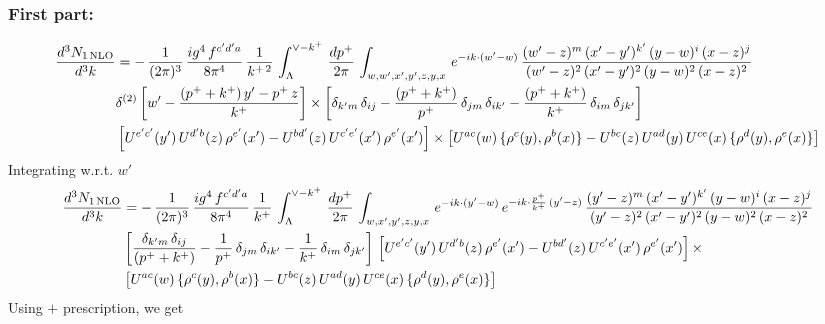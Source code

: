 \documentclass[9pt]{article}
\numberwithin{equation}{section}
\begin{document}
\subsubsection{First part:\,}
\begin{align}
     \frac{d^{3}N_{1\,\rm NLO}}{d^{3}k} & = -\, \frac{1}{(2\pi)^{3}}\,\frac{ig^{4}\,f^{c'd'a}}{8\pi^{4}}\, \frac{1}{k^{+\,2}}\,\int_{\Lambda}^{\vee-k^{+}}\, \frac{dp^{+}}{2\pi}\, \int_{w,w',x',y',z,y,x}\, e^{-ik\cdot (w'-w)}\, \frac{(w'-z)^{m}\,(x'-y')^{k'}\,(y-w)^{i}\,(x-z)^{j}}{(w'-z)^{2}\,(x'-y')^{2}\,(y-w)^{2}\,(x-z)^{2}}\notag \\ & \delta^{(2)}\left[w'-\frac{(p^{+}+k^{+})\,y'-p^{+}\,z}{k^{+}}\right]\times \left[\delta_{k'm}\,\delta_{ij}-\frac{(p^{+}+k^{+})}{p^{+}}\,\delta_{jm}\,\delta_{ik'}-\frac{(p^{+}+k^{+})}{k^{+}}\, \delta_{im}\, \delta_{jk'}\right]\notag \\ & \left[U^{e'c'}(y')\,U^{d'b}(z)\,\rho^{e'}(x')-U^{bd'}(z)\,U^{c'e'}(x')\,\rho^{e'}(x')\right]\times \left[U^{ac}(w)\, \{\rho^{c}(y),\rho^{b}(x)\}-U^{bc}(z)\,U^{ad}(y)\,U^{ce}(x)\,\{\rho^{d}(y),\rho^{e}(x)\}\right]
\end{align}
Integrating w.r.t. $w'$
\begin{align}
     \frac{d^{3}N_{1\,\rm NLO}}{d^{3}k} & = -\,\frac{1}{(2\pi)^{3}}\, \frac{ig^{4}\,f^{c'd'a}}{8\pi^{4}}\, \frac{1}{k^{+}}\,\int_{\Lambda}^{\vee-k^{+}}\,  \frac{dp^{+}}{2\pi}\, \int_{w,x',y',z,y,x}\, e^{-ik\cdot (y'-w)}\, e^{-ik\cdot \frac{p^{+}}{k^{+}}\,(y'-z)}\,\frac{(y'-z)^{m}\,(x'-y')^{k'}\,(y-w)^{i}\,(x-z)^{j}}{(y'-z)^{2}\,(x'-y')^{2}\,(y-w)^{2}\,(x-z)^{2}}\notag \\ & \left[\frac{\delta_{k'm}\,\delta_{ij}}{(p^{+}+k^{+})}-\frac{1}{p^{+}}\,\delta_{jm}\,\delta_{ik'}-\frac{1}{k^{+}}\, \delta_{im}\, \delta_{jk'}\right]\, \left[U^{e'c'}(y')\,U^{d'b}(z)\,\rho^{e'}(x')-U^{bd'}(z)\,U^{c'e'}(x')\,\rho^{e'}(x')\right]\times\notag \\ &  \left[U^{ac}(w)\, \{\rho^{c}(y),\rho^{b}(x)\}-U^{bc}(z)\,U^{ad}(y)\,U^{ce}(x)\,\{\rho^{d}(y),\rho^{e}(x)\}\right]
\end{align} 
Using $+$ prescription, we get
\end{document}
